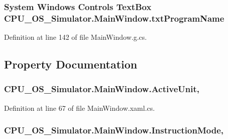 \subsubsection[{txt\+Program\+Name}]{\setlength{\rightskip}{0pt plus 5cm}System Windows Controls Text\+Box C\+P\+U\+\_\+\+O\+S\+\_\+\+Simulator.\+Main\+Window.\+txt\+Program\+Name\hspace{0.3cm}{\ttfamily [package]}}\label{class_c_p_u___o_s___simulator_1_1_main_window_a2c64b45db8c1d7a30c2f9155899cf918}


Definition at line 142 of file Main\+Window.\+g.\+cs.



\subsection{Property Documentation}
\hypertarget{class_c_p_u___o_s___simulator_1_1_main_window_a3d03550a73d7ab18ebd143a38dbf1431}{}
\subsubsection[{Active\+Unit}]{ C\+P\+U\+\_\+\+O\+S\+\_\+\+Simulator.\+Main\+Window.\+Active\+Unit\hspace{0.3cm}{\ttfamily [get]}, {\ttfamily [set]}}\label{class_c_p_u___o_s___simulator_1_1_main_window_a3d03550a73d7ab18ebd143a38dbf1431}


Definition at line 67 of file Main\+Window.\+xaml.\+cs.

\hypertarget{class_c_p_u___o_s___simulator_1_1_main_window_a65916937137002c26f9eb1c88cfff519}{}
\subsubsection[{Instruction\+Mode}]{ C\+P\+U\+\_\+\+O\+S\+\_\+\+Simulator.\+Main\+Window.\+Instruction\+Mode\hspace{0.3cm}{\ttfamily [get]}, {\ttfamily [set]}}\label{class_c_p_u___o_s___simulator_1_1_main_window_a65916937137002c26f9eb1c88cfff519}


